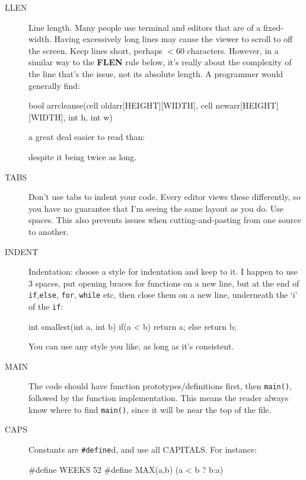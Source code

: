 \begin{description}

\item[LLEN] Line length. Many people use terminal and editors that are
of a fixed-width. Having excessively long lines may cause the viewer to scroll to
off the screen. Keep lines short, perhaps $< 60$ characters. However, in a similar way
to the {\bf FLEN} rule below, it's really about the complexity of the line that's the issue,
not its absolute length. A programmer would generally find:
{\small
\begin{codesnippet}
bool arrcleanse(cell oldarr[HEIGHT][WIDTH], cell newarr[HEIGHT][WIDTH], int h, int w)
\end{codesnippet}
}
a great deal easier to read than:
\begin{codesnippet}
if(a < b && j++ >= szpar(e ? true : false) || h==4){
\end{codesnippet}
despite it being twice as long.

\item[TABS] Don't use tabs to indent your code. Every editor views these differently, so you have no guarantee that I'm seeing the same layout as you do. Use spaces. This also prevents issues when cutting-and-pasting from one source to another.

\item[INDENT] Indentation: choose a style for indentation
and keep to it. I happen to use $3$ spaces, put opening braces
for functions on a new line, but at the end of \verb^if^,\verb^else^, \verb^for^, \verb^while^ etc, then close them on a new line, underneath the `i' of the \verb^if^:
\begin{codesnippet}
int smallest(int a, int b)
{
   if(a < b){
      return a;
   }
   else{
      return b;
   }
}
\end{codesnippet}
You can use any style you like, as long as it's consistent.

\item[MAIN] The code should have function prototypes/definitions first, then \verb^main()^, followed by the function implementation. This means the reader always know where to find \verb^main()^, since it will be near the top of the file.


\item[CAPS] Constants are \verb^#define^d, and use all CAPITALS. For instance:
\begin{codesnippet}
#define WEEKS 52
#define MAX(a,b) (a < b ? b:a)
\end{codesnippet}



\end{description}
